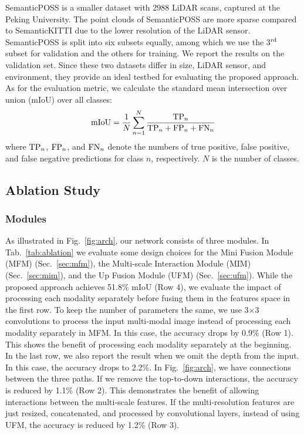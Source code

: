 \documentclass[letterpaper, 10 pt, journal, twoside]{ieeetran}
\newcommand{\figref}[1]{Fig.~\ref{#1}}
\newcommand{\tabref}[1]{Tab.~\ref{#1}}
\newcommand{\secref}[1]{Sec.~\ref{#1}}
\newcommand{\todo}[1]{#1}
\begin{document}
SemanticPOSS is a smaller dataset with 2988 LiDAR scans, captured at the Peking University. 
The point clouds of SemanticPOSS are more sparse compared to SemanticKITTI due to the lower resolution of the LiDAR sensor. 
SemanticPOSS is split into six subsets equally, among which we use the 3$^{\rm rd}$ subset for validation and the others for training.
We report the results on the validation set.
Since these two datasets differ in size, LiDAR sensor, and environment, they provide an ideal testbed for evaluating the proposed approach.    
As for the evaluation metric, we calculate the standard mean intersection over union (mIoU)
\cite{everingham2015pascal} over all classes:
\begin{equation}
    {\rm mIoU} = \frac{1}{N} \sum_{n=1}^{N} \frac{{\rm TP}_n}{{\rm TP}_n + {\rm FP}_n + {\rm FN}_n}
\end{equation}
where ${\rm TP}_n$, ${\rm FP}_n$, and ${\rm FN}_n$ denote the numbers of true
positive, false positive, and false negative predictions for
class $n$, respectively.
$N$ is the number of classes.




\subsection{Ablation Study}

\subsubsection{Modules}\label{sec:modules}
As illustrated in \figref{fig:arch}, our network consists of three modules.
In \tabref{tab:ablation} we evaluate some design choices for the Mini Fusion Module (MFM) (\secref{sec:mfm}), the Multi-scale Interaction Module (MIM) (\secref{sec:mim}), and the Up Fusion Module (UFM) (\secref{sec:ufm}). 
While the proposed approach achieves 51.8\% mIoU (Row 4), we evaluate the impact of processing each modality separately before fusing them in the features space in the first row. To keep the number of parameters the same, we use 3$\times$3 convolutions to process the input multi-modal image instead of processing each modality separately in MFM. In this case, the accuracy drops by 0.9\% (Row 1). This shows the benefit of processing each modality separately at the beginning. \todo{In the last row, we also report the result when we omit the depth from the input. In this case, the accuracy drops to 2.2\%.} In \figref{fig:arch}, we have connections between the three paths. If we remove the top-to-down interactions, the accuracy is reduced by 1.1\% (Row 2). This demonstrates the benefit of allowing interactions between the multi-scale features. If the multi-resolution features are just resized, concatenated, and processed by convolutional layers, instead of using UFM, the accuracy is reduced by 1.2\% (Row 3).
\end{document}
